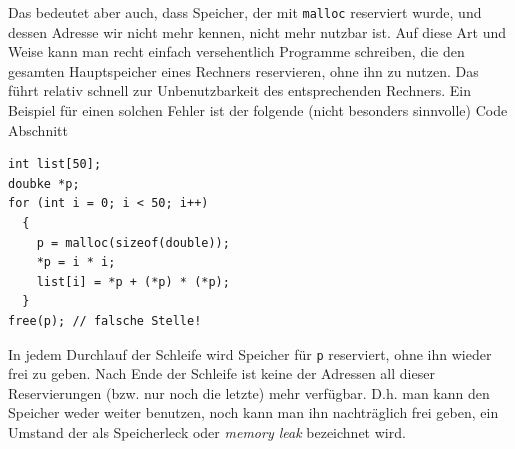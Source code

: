 Das bedeutet aber auch, dass Speicher, der mit \verb|malloc| reserviert wurde, und dessen Adresse wir nicht mehr kennen, nicht mehr nutzbar ist.
Auf diese Art und Weise kann man recht einfach versehentlich Programme schreiben, die den gesamten Hauptspeicher eines Rechners reservieren, ohne ihn zu nutzen.
Das führt relativ schnell zur Unbenutzbarkeit des entsprechenden Rechners.
Ein Beispiel für einen solchen Fehler ist der folgende (nicht besonders sinnvolle) Code Abschnitt
\begin{lstlisting}
int list[50];
doubke *p;
for (int i = 0; i < 50; i++)
  {
    p = malloc(sizeof(double));
    *p = i * i;
    list[i] = *p + (*p) * (*p);
  }
free(p); // falsche Stelle!
\end{lstlisting}
In jedem Durchlauf der Schleife wird Speicher für \verb|p| reserviert, ohne ihn wieder frei zu geben.
Nach Ende der Schleife ist keine der Adressen all dieser Reservierungen (bzw. nur noch die letzte) mehr verfügbar.
D.h. man kann den Speicher weder weiter benutzen, noch kann man ihn nachträglich frei geben, ein Umstand der als Speicherleck oder \emph{memory leak} bezeichnet wird.

\endinput
